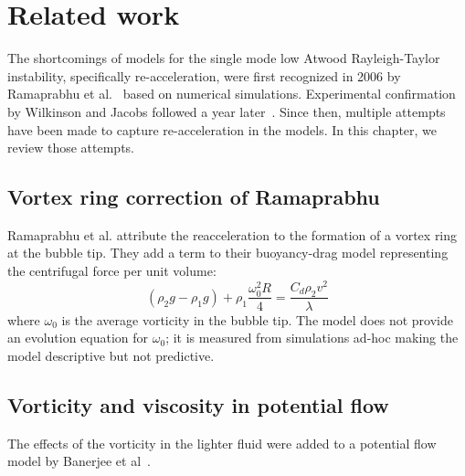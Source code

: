 \chapter{Related work}

The shortcomings of models for the single mode low Atwood Rayleigh-Taylor instability, specifically re-acceleration, were first recognized in 2006 by Ramaprabhu et al.~\cite{Ramaprabhu2006} based on numerical simulations.
Experimental confirmation by Wilkinson and Jacobs followed a year later~\cite{Wilkinson2007}.
Since then, multiple attempts have been made to capture re-acceleration in the models.
In this chapter, we review those attempts.

\section{Vortex ring correction of Ramaprabhu}

Ramaprabhu et al. attribute the reacceleration to the formation of a vortex ring at the bubble tip.
They add a term to their buoyancy-drag model representing the centrifugal force per unit volume:
\begin{equation}
\left(\rho_2 g - \rho_1 g\right) + \rho_1 \frac{\omega_0^2 R}{ 4} = \frac{C_d \rho_2 v^2}{\lambda}
\end{equation}
where $\omega_0$ is the average vorticity in the bubble tip.
The model does not provide an evolution equation for $\omega_0$; it is measured from simulations ad-hoc making the model descriptive but not predictive.

\section{Vorticity and viscosity in potential flow}

The effects of the vorticity in the lighter fluid were added to a potential flow model by Banerjee et al~\cite{Banerjee2011}.

